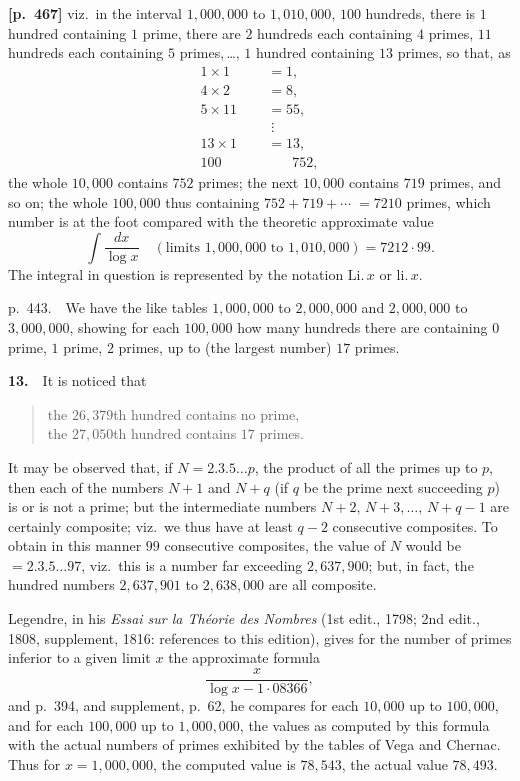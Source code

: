 \documentclass[11pt,a4paper]{article}
\begin{document}
\bigskip
\noindent\textbf{[p.~467]}\quad
viz.\ in the interval $1{,}000{,}000$ to $1{,}010{,}000$, $100$ hundreds, there is $1$ hundred containing $1$ prime, there are $2$ hundreds each containing $4$ primes, $11$ hundreds each containing $5$ primes,\,\ldots, $1$ hundred containing $13$ primes, so that, as
\[
\begin{aligned}
1\times 1   &=  1,\\
4\times 2   &=  8,\\
5\times 11  &=  55,\\
&\;\vdots\\
13\times 1  &=  13,\\\hline
100\phantom{XXX} &\phantom{=\;}\,752,
\end{aligned}
\]
the whole $10{,}000$ contains $752$ primes; the next $10{,}000$ contains $719$ primes, and so on; the whole $100{,}000$ thus containing $752+719+\cdots\;=7210$ primes, which number is at the foot compared with the theoretic approximate value
\[
\int\frac{dx}{\log x}\quad(\text{limits }1{,}000{,}000\text{ to }1{,}010{,}000) = 7212\cdot 99.
\]
The integral in question is represented by the notation $\mathrm{Li}.\,x$ or $\mathrm{li}.\,x$.

p.~443.\ \ We have the like tables $1{,}000{,}000$ to $2{,}000{,}000$ and $2{,}000{,}000$ to $3{,}000{,}000$, showing for each $100{,}000$ how many hundreds there are containing $0$ prime, $1$ prime, $2$ primes, up to (the largest number) $17$ primes.

\textbf{13.}\ \ It is noticed that
\begin{quote}
the $26{,}379$th hundred contains no prime,\\
the $27{,}050$th hundred contains $17$ primes.
\end{quote}

It may be observed that, if $N=2.3.5\ldots p$, the product of all the primes up to $p$, then each of the numbers $N+1$ and $N+q$ (if $q$ be the prime next succeeding $p$) is or is not a prime; but the intermediate numbers $N+2,\,N+3,\ldots,\,N+q-1$ are certainly composite; viz.\ we thus have at least $q-2$ consecutive composites.   To obtain in this manner $99$ consecutive composites, the value of $N$ would be $=2.3.5\ldots 97$, viz.\ this is a number far exceeding $2{,}637{,}900$; but, in fact, the hundred numbers $2{,}637{,}901$ to $2{,}638{,}000$ are all composite.

Legendre, in his \textit{Essai sur la Th\'eorie des Nombres} (1st edit., 1798; 2nd edit., 1808, supplement, 1816: references to this edition), gives for the number of primes inferior to a given limit $x$ the approximate formula
\[
\frac{x}{\log x-1\cdot 08366},
\]
and p.~394, and supplement, p.~62, he compares for each $10{,}000$ up to $100{,}000$, and for each $100{,}000$ up to $1{,}000{,}000$, the values as computed by this formula with the actual numbers of primes exhibited by the tables of Vega and Chernac.   Thus for $x=1{,}000{,}000$, the computed value is $78{,}543$, the actual value $78{,}493$.
\end{document}

